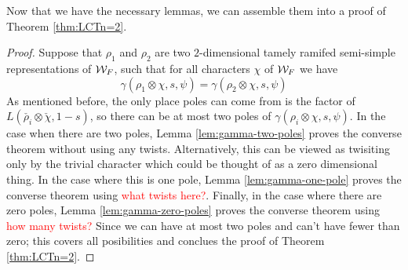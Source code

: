 Now that we have the necessary lemmas, we can assemble them into a proof of Theorem \ref{thm:LCTn=2}.
\begin{proof}
  Suppose that $\rho_1$ and $\rho_2$ are two $2$-dimensional tamely ramifed semi-simple representations of $\mathcal{W}_F$, such that for all characters $\chi$ of $\mathcal{W}_F$ we have
  \[\gamma(\rho_1 \otimes \chi,s,\psi) = \gamma(\rho_2 \otimes \chi, s, \psi)\]
  As mentioned before, the only place poles can come from is the factor of $L(\check{\rho_i} \otimes \check{\chi},1-s)$, so there can be at most two poles of $\gamma(\rho_i \otimes \chi, s, \psi)$.
  In the case when there are two poles, Lemma \ref{lem:gamma-two-poles} proves the converse theorem without using any twists.
  Alternatively, this can be viewed as twisiting only by the trivial character which could be thought of as a zero dimensional thing.
  In the case where this is one pole, Lemma \ref{lem:gamma-one-pole} proves the converse theorem using \textcolor{red}{what twists here?}.
  Finally, in the case where there are zero poles, Lemma \ref{lem:gamma-zero-poles} proves the converse theorem using \textcolor{red}{how many twists?}
  Since we can have at most two poles and can't have fewer than zero; this covers all posibilities and conclues the proof of Theorem \ref{thm:LCTn=2}.
\end{proof}

\endinput
